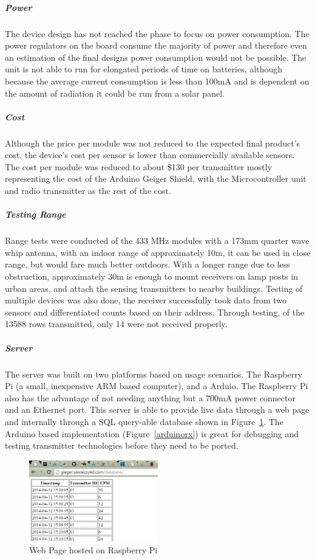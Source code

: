 \documentclass[10pt]{article}
\begin{document}
\subparagraph{Power}
The device design has not reached the phase to focus on power consumption. The power regulators on the board consume the majority of power and therefore even an estimation of the final designs power consumption would not be possible. The unit is not able to run for elongated periods of time on batteries, although because the average current consumption is less than 100mA and is dependent on the amount of radiation it could be run from a solar panel.

\subparagraph{Cost}
Although the price per module was not reduced to the expected final product's cost, the device's cost per sensor is lower than commercially available sensors. The cost per module was reduced to about \$130 per transmitter mostly representing the cost of the Arduino Geiger Shield, with the Microcontroller unit and radio transmitter as the rest of the cost.

\subparagraph{Testing Range}
Range tests were conducted of the 433 MHz modules with a 173mm quarter wave whip antenna, with an indoor range of approximately 10m, it can be used in close range, but would fare much better outdoors. With a longer range due to less obstruction, approximately 30m is enough to mount receivers on lamp posts in urban areas, and attach the sensing transmitters to nearby buildings. Testing of multiple devices was also done, the receiver successfully took data from two sensors and differentiated counts based on their address. Through testing, of the 13588 rows transmitted, only 14 were not received properly.

\subparagraph{Server}

The server was built on two platforms based on usage scenarios. The Raspberry Pi (a small, inexpensive ARM based computer), and a Arduio. The Raspberry Pi also has the advantage of not needing anything but a 700mA power connector and an Ethernet port. This server is able to provide live data through a web page and internally through a SQL query-able database shown in Figure~\ref{webPage}. The Arduino based implementation (Figure~\ref{arduinorx}) is great for debugging and testing transmitter technologies before they need to be ported.

\begin{figure}[h]
	\centering
	\includegraphics[width=0.5\textwidth]{WebDatabase.png}
	\caption{Web Page hosted on Raspberry Pi \label{webPage}}
\end{figure}
\end{document}
